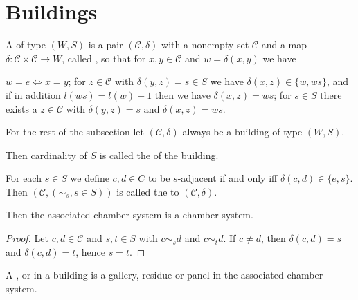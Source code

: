 \section{Buildings}

\begin{defi}
	A  of type $(W,S)$ is a pair $(\mathcal{C}, \delta)$ with a nonempty set $\mathcal{C}$ and a map $\delta : \mathcal{C} \times \mathcal{C} \to W$, called , so that for $x,y \in \mathcal C$ and $w = \delta(x,y)$ we have
	\begin{axioms}
		 $w = e \iff x = y$;
		 for $z \in \mathcal C$ with $\delta(y,z) = s \in S$ we have $\delta(x,z) \in \{w,ws\}$, and if in addition $l(ws) = l(w) + 1$ then we have $\delta(x,z) = ws$;
		 for $s \in S$ there exists a $z \in \mathcal C$ with $\delta(y,z) = s$ and $\delta(x,z) = ws$.
	\end{axioms}
\end{defi}

For the rest of the subsection let $(\mathcal{C}, \delta)$ always be a building of type $(W,S)$.

\begin{defi}
	Then cardinality of $S$ is called the  of the building.
\end{defi}

\begin{defi}
	For each $s \in S$ we define $c,d \in C$ to be $s$-adjacent if and only iff $\delta(c,d) \in \{e,s\}$. Then $(\mathcal{C}, (\sim_s, s \in S))$ is called the  to $(\mathcal{C}, \delta)$.
\end{defi}

\begin{lemm}
	Then the associated chamber system is a chamber system.

	\begin{proof}
		Let $c,d \in \mathcal{C}$ and $s,t \in S$ with $c \sim_s d$ and $c \sim_t d$. If $c \neq d$, then $\delta(c,d) = s$ and $\delta(c,d) = t$, hence $s = t$.
	\end{proof}
\end{lemm}

\begin{defi}
	A ,  or  in a building is a gallery, residue or panel in the associated chamber system.
\end{defi}

